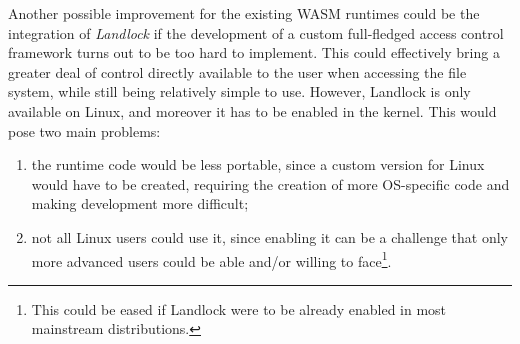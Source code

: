 Another possible improvement for the existing WASM runtimes could be the integration of \textit{Landlock}
if the development of a custom full-fledged access control framework turns out to be too hard to implement.
This could effectively bring a greater deal of control directly available to the user when
accessing the file system, while still being relatively simple to use.
However, Landlock is only available on Linux, and moreover it has to be enabled in the kernel.
This would pose two main problems:
\begin{enumerate}
  \item the runtime code would be less portable, since a custom version for Linux would have to be created, requiring
        the creation of more OS-specific code and making development more difficult;
  \item not all Linux users could use it, since enabling it can be a challenge that only more advanced users
        could be able and/or willing to face\footnote{This could be eased if Landlock were to be already enabled in most mainstream distributions.}.
\end{enumerate}
